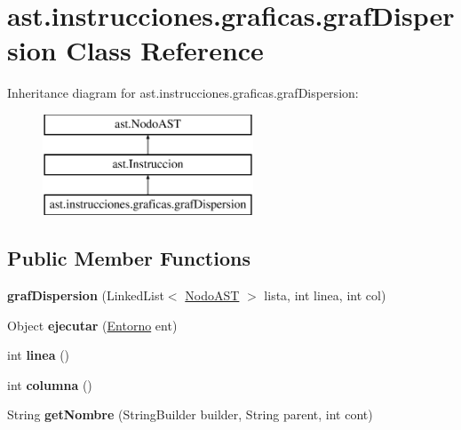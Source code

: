 \hypertarget{classast_1_1instrucciones_1_1graficas_1_1graf_dispersion}{}\section{ast.\+instrucciones.\+graficas.\+graf\+Dispersion Class Reference}
\label{classast_1_1instrucciones_1_1graficas_1_1graf_dispersion}
Inheritance diagram for ast.\+instrucciones.\+graficas.\+graf\+Dispersion\+:\begin{figure}[H]
\begin{center}
\leavevmode
\includegraphics[height=3.000000cm]{classast_1_1instrucciones_1_1graficas_1_1graf_dispersion}
\end{center}
\end{figure}
\subsection*{Public Member Functions}
\begin{DoxyCompactItemize}
\item 
\mbox{\label{classast_1_1instrucciones_1_1graficas_1_1graf_dispersion_ac66ae765e6a5140a669c7216c2d61759}} 
{\bfseries graf\+Dispersion} (Linked\+List$<$ \mbox{\hyperlink{interfaceast_1_1_nodo_a_s_t}{Nodo\+A\+ST}} $>$ lista, int linea, int col)
\item 
\mbox{\label{classast_1_1instrucciones_1_1graficas_1_1graf_dispersion_a8926d9b2844b4bcfe0966e1e89cc0fa6}} 
Object {\bfseries ejecutar} (\mbox{\hyperlink{classentorno_1_1_entorno}{Entorno}} ent)
\item 
\mbox{\label{classast_1_1instrucciones_1_1graficas_1_1graf_dispersion_a5a1cb628350719206704f21a8ea438e3}} 
int {\bfseries linea} ()
\item 
\mbox{\label{classast_1_1instrucciones_1_1graficas_1_1graf_dispersion_afc9d93242c8b1371ee6d6286723121fe}} 
int {\bfseries columna} ()
\item 
\mbox{\label{classast_1_1instrucciones_1_1graficas_1_1graf_dispersion_ab0590544f132a3a7717e797d2d675a61}} 
String {\bfseries get\+Nombre} (String\+Builder builder, String parent, int cont)
\end{DoxyCompactItemize}


